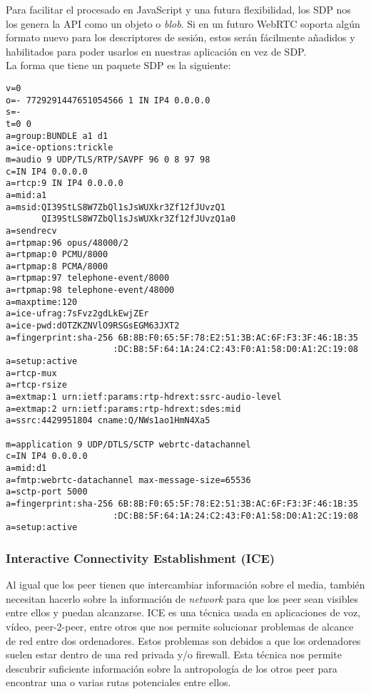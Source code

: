 Para facilitar el procesado en JavaScript y una futura flexibilidad, los SDP nos los genera la API como un objeto o \textit{blob}. Si en un futuro WebRTC soporta algún formato nuevo para los descriptores de sesión, estos serán fácilmente añadidos y habilitados para poder usarlos en nuestras aplicación en vez de SDP.\\

La forma que tiene un paquete SDP es la siguiente:

\begin{lstlisting}[caption=Ejemplo paquete SDP]
v=0
o=- 7729291447651054566 1 IN IP4 0.0.0.0
s=-
t=0 0
a=group:BUNDLE a1 d1
a=ice-options:trickle
m=audio 9 UDP/TLS/RTP/SAVPF 96 0 8 97 98
c=IN IP4 0.0.0.0
a=rtcp:9 IN IP4 0.0.0.0
a=mid:a1
a=msid:QI39StLS8W7ZbQl1sJsWUXkr3Zf12fJUvzQ1
       QI39StLS8W7ZbQl1sJsWUXkr3Zf12fJUvzQ1a0
a=sendrecv
a=rtpmap:96 opus/48000/2
a=rtpmap:0 PCMU/8000
a=rtpmap:8 PCMA/8000
a=rtpmap:97 telephone-event/8000
a=rtpmap:98 telephone-event/48000
a=maxptime:120
a=ice-ufrag:7sFvz2gdLkEwjZEr
a=ice-pwd:dOTZKZNVlO9RSGsEGM63JXT2
a=fingerprint:sha-256 6B:8B:F0:65:5F:78:E2:51:3B:AC:6F:F3:3F:46:1B:35
                     :DC:B8:5F:64:1A:24:C2:43:F0:A1:58:D0:A1:2C:19:08
a=setup:active
a=rtcp-mux
a=rtcp-rsize
a=extmap:1 urn:ietf:params:rtp-hdrext:ssrc-audio-level
a=extmap:2 urn:ietf:params:rtp-hdrext:sdes:mid
a=ssrc:4429951804 cname:Q/NWs1ao1HmN4Xa5

m=application 9 UDP/DTLS/SCTP webrtc-datachannel
c=IN IP4 0.0.0.0
a=mid:d1
a=fmtp:webrtc-datachannel max-message-size=65536
a=sctp-port 5000
a=fingerprint:sha-256 6B:8B:F0:65:5F:78:E2:51:3B:AC:6F:F3:3F:46:1B:35
                     :DC:B8:5F:64:1A:24:C2:43:F0:A1:58:D0:A1:2C:19:08
a=setup:active
\end{lstlisting}


\subsubsection{Interactive Connectivity Establishment (ICE)}

Al igual que los peer tienen que intercambiar información sobre el media, también necesitan hacerlo sobre la información de \textit{network} para que los peer sean visibles entre ellos y puedan alcanzarse. ICE es una técnica usada en aplicaciones de voz, vídeo, peer-2-peer, entre otros que nos permite solucionar problemas de alcance de red entre dos ordenadores. Estos problemas son debidos a que los ordenadores suelen estar dentro de una red privada y/o firewall. Esta técnica nos permite descubrir suficiente información sobre la antropología de los otros peer para encontrar una o varias rutas potenciales entre ellos.\\

